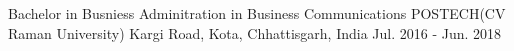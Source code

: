 

\begin{cventries}

  \cventry
    {Bachelor in Busniess Adminitration in Business Communications} %
    {POSTECH(CV Raman University)} %
    {Kargi Road, Kota, Chhattisgarh, India} %
    {Jul. 2016 - Jun. 2018} %
    {
      \begin{cvitems} %
      \end{cvitems}
    }

\end{cventries}
